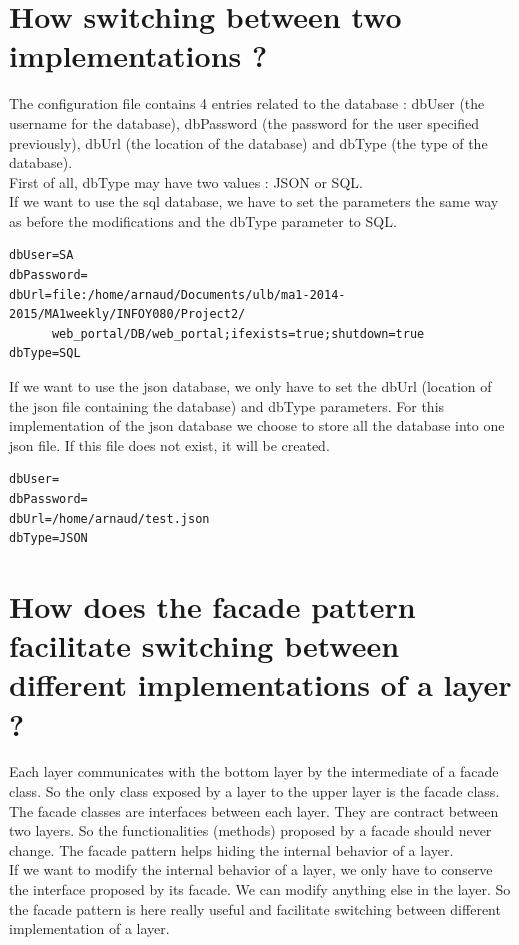 \documentclass[a4paper,10pt]{article}
\begin{document}
\section{How switching between two implementations ?}
The configuration file contains 4 entries related to the database : dbUser (the username for the database), dbPassword (the password for the user specified previously), dbUrl (the location of the database) and dbType (the type of the database).\\
First of all, dbType may have two values : JSON or SQL.\\
If we want to use the sql database, we have to set the parameters the same way as before the modifications and the dbType parameter to SQL.
\begin{verbatim}
dbUser=SA
dbPassword=
dbUrl=file:/home/arnaud/Documents/ulb/ma1-2014-2015/MA1weekly/INFOY080/Project2/
      web_portal/DB/web_portal;ifexists=true;shutdown=true
dbType=SQL
\end{verbatim}
If we want to use the json database, we only have to set the dbUrl (location of the json file containing the database) and dbType parameters. For this implementation of the json database we choose to store all the database into one json file. If this file does not exist, it will be created.
\begin{verbatim}
dbUser=
dbPassword=
dbUrl=/home/arnaud/test.json
dbType=JSON
\end{verbatim}


\section{How does the facade pattern facilitate switching between different implementations of a layer ?}
Each layer communicates with the bottom layer by the intermediate of a facade class. So the only class exposed by a layer to the upper layer is the facade class. The facade classes are interfaces between each layer. They are contract between two layers. So the functionalities (methods) proposed by a facade should never change. The facade pattern helps hiding the internal behavior of a layer.\\
If we want to modify the internal behavior of a layer, we only have to conserve the interface proposed by its facade. We can modify anything else in the layer. So the facade pattern is here really useful and facilitate switching between different implementation of a layer.
\end{document}
